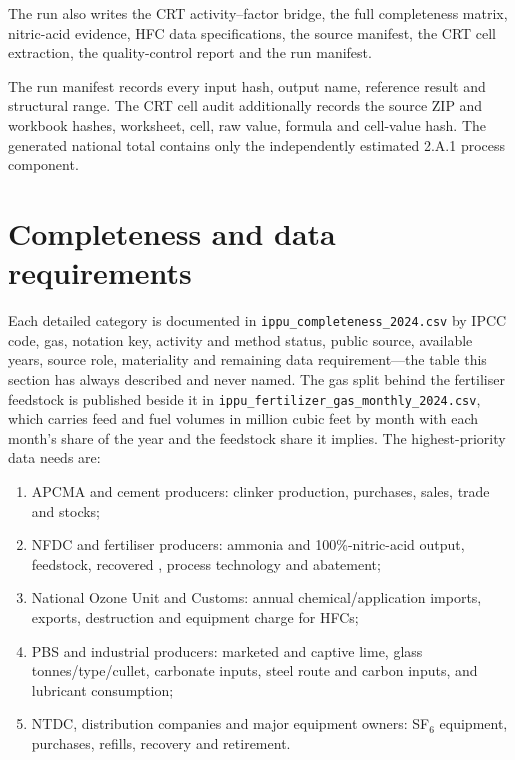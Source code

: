 The run also writes the CRT activity--factor bridge, the full completeness matrix, nitric-acid
evidence, HFC data specifications, the source manifest, the CRT cell extraction, the
quality-control report and the run manifest.

The run manifest records every input hash, output name, reference result and structural range.
The CRT cell audit additionally records the source ZIP and workbook hashes, worksheet, cell,
raw value, formula and cell-value hash. The generated national total contains only the
independently estimated 2.A.1 process \COtwo{} component.

\section{Completeness and data requirements}

Each detailed category is documented in \texttt{ippu\_completeness\_2024.csv} by IPCC code,
gas, notation key, activity and method status, public source, available years, source role,
materiality and remaining data requirement---the table this section has always described and
never named. The gas split behind the fertiliser feedstock is published beside it in
\texttt{ippu\_\allowbreak fertilizer\_\allowbreak gas\_\allowbreak monthly\_\allowbreak 2024.csv}, which carries feed and fuel
volumes in million cubic feet by month with each month's share of the year and the feedstock share it
implies. The highest-priority data needs are:

\begin{enumerate}[leftmargin=*]
\item APCMA and cement producers: clinker production, purchases, sales, trade and stocks;
\item NFDC and fertiliser producers: ammonia and 100\%-nitric-acid output, feedstock, recovered
      \COtwo{}, process technology and \NtwoO{} abatement;
\item National Ozone Unit and Customs: annual chemical/application imports, exports,
      destruction and equipment charge for HFCs;
\item PBS and industrial producers: marketed and captive lime, glass tonnes/type/cullet,
      carbonate inputs, steel route and carbon inputs, and lubricant consumption;
\item NTDC, distribution companies and major equipment owners: SF$_6$ equipment, purchases,
      refills, recovery and retirement.
\end{enumerate}


